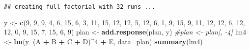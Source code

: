 \documentclass[]{article}
\newenvironment{Shaded}{\begin{snugshade}}{\end{snugshade}}
\newcommand{\KeywordTok}[1]{\textcolor[rgb]{0.13,0.29,0.53}{\textbf{#1}}}
\newcommand{\DataTypeTok}[1]{\textcolor[rgb]{0.13,0.29,0.53}{#1}}
\newcommand{\DecValTok}[1]{\textcolor[rgb]{0.00,0.00,0.81}{#1}}
\newcommand{\StringTok}[1]{\textcolor[rgb]{0.31,0.60,0.02}{#1}}
\newcommand{\CommentTok}[1]{\textcolor[rgb]{0.56,0.35,0.01}{\textit{#1}}}
\newcommand{\OperatorTok}[1]{\textcolor[rgb]{0.81,0.36,0.00}{\textbf{#1}}}
\newcommand{\NormalTok}[1]{#1}
\begin{document}
\begin{verbatim}
## creating full factorial with 32 runs ...
\end{verbatim}

\begin{Shaded}
\begin{Highlighting}[]
\NormalTok{y <-}\StringTok{ }\KeywordTok{c}\NormalTok{(}\DecValTok{9}\NormalTok{, }\DecValTok{9}\NormalTok{, }\DecValTok{9}\NormalTok{, }\DecValTok{4}\NormalTok{, }\DecValTok{6}\NormalTok{, }\DecValTok{15}\NormalTok{, }\DecValTok{6}\NormalTok{, }\DecValTok{3}\NormalTok{, }\DecValTok{11}\NormalTok{, }\DecValTok{15}\NormalTok{, }\DecValTok{12}\NormalTok{, }\DecValTok{12}\NormalTok{, }\DecValTok{5}\NormalTok{, }\DecValTok{12}\NormalTok{, }\DecValTok{6}\NormalTok{, }\DecValTok{1}\NormalTok{, }\DecValTok{9}\NormalTok{, }\DecValTok{15}\NormalTok{, }\DecValTok{9}\NormalTok{, }\DecValTok{11}\NormalTok{, }\DecValTok{12}\NormalTok{, }\DecValTok{12}\NormalTok{, }\DecValTok{6}\NormalTok{, }\DecValTok{12}\NormalTok{, }\DecValTok{12}\NormalTok{, }\DecValTok{0}\NormalTok{, }\DecValTok{9}\NormalTok{, }\DecValTok{15}\NormalTok{, }\DecValTok{7}\NormalTok{, }\DecValTok{15}\NormalTok{, }\DecValTok{6}\NormalTok{, }\DecValTok{9}\NormalTok{)}
\NormalTok{plan <-}\StringTok{ }\KeywordTok{add.response}\NormalTok{(plan, y)}
\CommentTok{#plan <- plan[, -4]}
\NormalTok{lm4 <-}\StringTok{ }\KeywordTok{lm}\NormalTok{(y}\OperatorTok{~}\NormalTok{(A }\OperatorTok{+}\StringTok{ }\NormalTok{B }\OperatorTok{+}\StringTok{ }\NormalTok{C }\OperatorTok{+}\StringTok{ }\NormalTok{D)}\OperatorTok{^}\DecValTok{4} \OperatorTok{+}\StringTok{ }\NormalTok{E, }\DataTypeTok{data=}\NormalTok{plan)}
\KeywordTok{summary}\NormalTok{(lm4)}
\end{Highlighting}
\end{Shaded}
\end{document}
